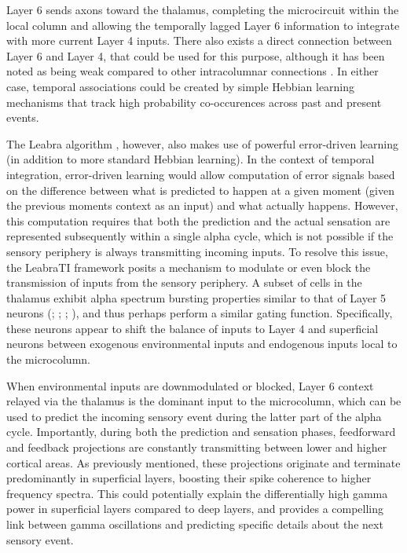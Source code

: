 \documentclass[dwyatte_dissertation.tex]{subfiles}
\begin{document}

Layer 6 sends axons toward the thalamus, completing the microcircuit within the local column and allowing the temporally lagged Layer 6 information to integrate with more current Layer 4 inputs. There also exists a direct connection between Layer 6 and Layer 4, that could be used for this purpose, although it has been noted as being weak compared to other intracolumnar connections \cite{HirschMartinez06b}. In either case, temporal associations could be created by simple Hebbian learning mechanisms that track high probability co-occurences across past and present events. %

The Leabra algorithm \cite{OReillyMunakata00,OReillyMunakataFrankEtAl12}, however, also makes use of powerful error-driven learning (in addition to more standard Hebbian learning). In the context of temporal integration, error-driven learning would allow computation of error signals based on the difference between what is predicted to happen at a given moment (given the previous moments context as an input) and what actually happens. However, this computation requires that both the prediction and the actual sensation are represented subsequently within a single alpha cycle, which is not possible if the sensory periphery is always transmitting incoming inputs. To resolve this issue, the LeabraTI framework posits a mechanism to modulate or even block the transmission of inputs from the sensory periphery. A subset of cells in the thalamus exhibit alpha spectrum bursting properties similar to that of Layer 5 neurons (; ; ; ), and thus perhaps perform a similar gating function. Specifically, these neurons appear to shift the balance of inputs to Layer 4 and superficial neurons between exogenous environmental inputs and endogenous inputs local to the microcolumn. %

When environmental inputs are downmodulated or blocked, Layer 6 context relayed via the thalamus is the dominant input to the microcolumn, which can be used to predict the incoming sensory event during the latter part of the alpha cycle. Importantly, during both the prediction and sensation phases, feedforward and feedback projections are constantly transmitting between lower and higher cortical areas. As previously mentioned, these projections originate and terminate predominantly in superficial layers, boosting their spike coherence to higher frequency spectra. This could potentially explain the differentially high gamma power in superficial layers compared to deep layers, and provides a compelling link between gamma oscillations and predicting specific details about the next sensory event.
\end{document}

